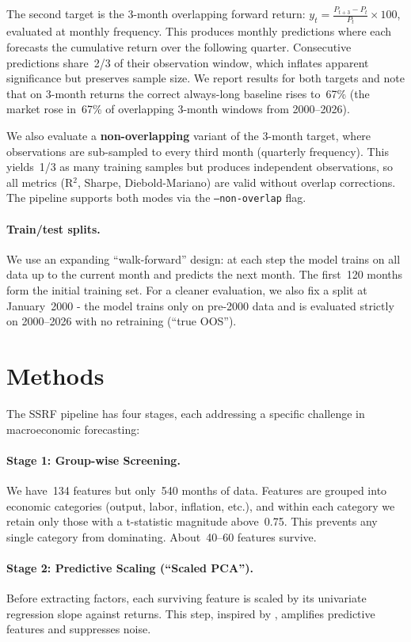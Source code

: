 \documentclass{article}
\begin{document}
The second target is the 3-month overlapping forward return:
$y_t = \frac{P_{t+3} - P_t}{P_t} \times 100$, evaluated at monthly frequency.
This produces monthly predictions where each forecasts the cumulative return
over the following quarter. Consecutive predictions share~2/3 of their
observation window, which inflates apparent significance but preserves sample
size. We report results for both targets and note that on 3-month returns
the correct always-long baseline rises to~67\% (the market rose in~67\% of
overlapping 3-month windows from 2000--2026).

We also evaluate a \textbf{non-overlapping} variant of the 3-month target,
where observations are sub-sampled to every third month (quarterly frequency).
This yields~1/3 as many training samples but produces independent observations,
so all metrics (R$^2$, Sharpe, Diebold-Mariano) are valid without overlap
corrections. The pipeline supports both modes via the \texttt{--non-overlap}
flag.

\paragraph{Train/test splits.}
We use an expanding ``walk-forward'' design: at each step the model trains on
all data up to the current month and predicts the next month. The first~120
months form the initial training set. For a cleaner evaluation, we also fix a
split at January~2000 - the model trains only on pre-2000 data and is
evaluated strictly on 2000--2026 with no retraining (``true OOS'').


\section{Methods}

The SSRF pipeline has four stages, each addressing a specific challenge in
macroeconomic forecasting:

\paragraph{Stage 1: Group-wise Screening.}
We have~134 features but only~540 months of data. Features are grouped into
economic categories (output, labor, inflation, etc.), and within each
category we retain only those with a t-statistic magnitude above~0.75. This
prevents any single category from dominating. About~40--60 features survive.

\paragraph{Stage 2: Predictive Scaling (``Scaled PCA'').}
Before extracting factors, each surviving feature is scaled by its univariate
regression slope against returns. This step, inspired by
\citet{huang2022scaled}, amplifies predictive features and suppresses noise.
\end{document}
